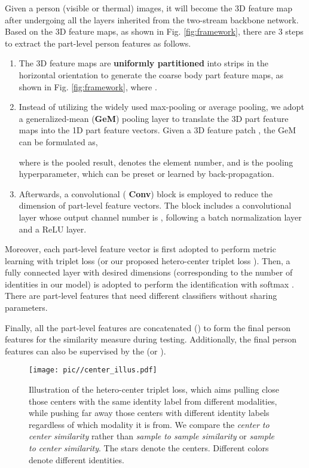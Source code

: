 \documentclass[journal]{IEEEtran}
\begin{document}
Given a person (visible or thermal) images, it will become the 3D feature map after undergoing all the layers inherited from the two-stream backbone network. Based on the 3D feature maps, as shown in Fig. \ref{fig:framework}, there are 3 steps to extract the part-level person features as follows.
\begin{enumerate}
  \item The 3D feature maps are \textbf{uniformly partitioned} into  strips in the horizontal orientation to generate the coarse body part feature maps, as shown in Fig. \ref{fig:framework}, where .
  \item Instead of utilizing the widely used max-pooling or average pooling, we adopt a generalized-mean (\textbf{GeM}) \cite{radenovic2018fine} pooling layer to translate the 3D part feature maps into the 1D part feature vectors. Given a 3D feature patch , the GeM can be formulated as,
      
      where  is the pooled result,  denotes the element number, and  is the pooling hyperparameter, which can be preset or learned by back-propagation.
\item Afterwards, a  convolutional (\textbf{ Conv}) block is employed to reduce the dimension of part-level feature vectors. The block includes a  convolutional layer whose output channel number is , following a batch normalization layer and a ReLU layer.
\end{enumerate}

Moreover, each part-level feature vector is first adopted to perform metric learning with triplet loss  (or our proposed hetero-center triplet loss ). Then, a fully connected layer with desired dimensions (corresponding to the number of identities in our model) is adopted to perform the identification with softmax . There are  part-level features that need  different classifiers without sharing parameters.

Finally, all the  part-level features are concatenated () to form the final person features for the similarity measure during testing. Additionally, the final person features can also be supervised by the  (or ).

\begin{figure}
\centering
\texttt{[image: pic//center\_illus.pdf]}
\caption{Illustration of the hetero-center triplet loss, which aims pulling close those centers with the same identity label from different modalities, while pushing far away those centers with different identity labels regardless of which modality it is from. We compare the \emph{center to center similarity} rather than \emph{sample to sample similarity} or \emph{sample to center similarity}. The stars denote the centers. Different colors denote different identities. }
\label{fig:center_illus}
\end{figure}
\end{document}
